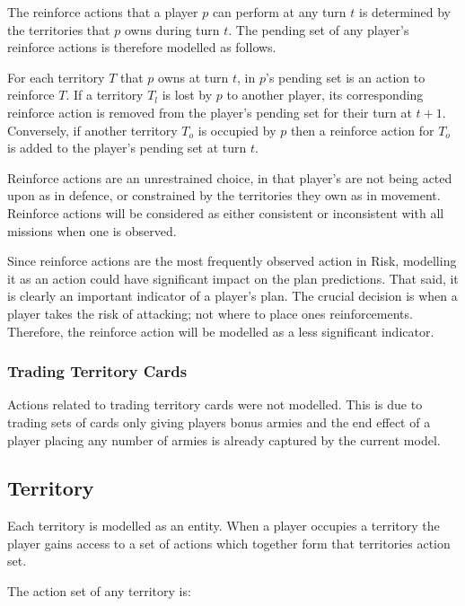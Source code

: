 \documentclass[parskip]{cs4rep}
\begin{document}
The reinforce actions that a player $p$ can perform at any turn $t$ is determined by the territories that $p$ owns during turn $t$. The pending set of any player’s reinforce actions is therefore modelled as follows. 

For each territory $T$ that $p$ owns at turn $t$, in $p$'s pending set is an action to reinforce $T$. If a territory $T_{l}$ is lost by $p$ to another player, its corresponding reinforce action is removed from the player’s pending set for their turn at $t+1$. Conversely, if another territory $T_{o}$ is occupied by $p$ then a reinforce action for $T_{o}$ is added to the player’s pending set at turn $t$. 

Reinforce actions are an unrestrained choice, in that player’s are not being acted upon as in defence, or constrained by the territories they own as in movement. Reinforce actions will be considered as either consistent or inconsistent with all missions when one is observed. 

Since reinforce actions are the most frequently observed action in Risk, modelling it as an action could have significant impact on the plan predictions. That said, it is clearly an important indicator of a player’s plan. The crucial decision is when a player takes the risk of attacking; not where to place ones reinforcements. Therefore, the reinforce action will be modelled as a less significant indicator. 

\subsubsection{Trading Territory Cards}

Actions related to trading territory cards were not modelled. This is due to trading sets of cards only giving players bonus armies and the end effect of a player placing any number of armies is already captured by the current model.

\subsection{Territory}

Each territory is modelled as an entity. When a player occupies a territory the player gains access to a set of actions which together form that territories action set.

The action set of any territory is:
\end{document}
